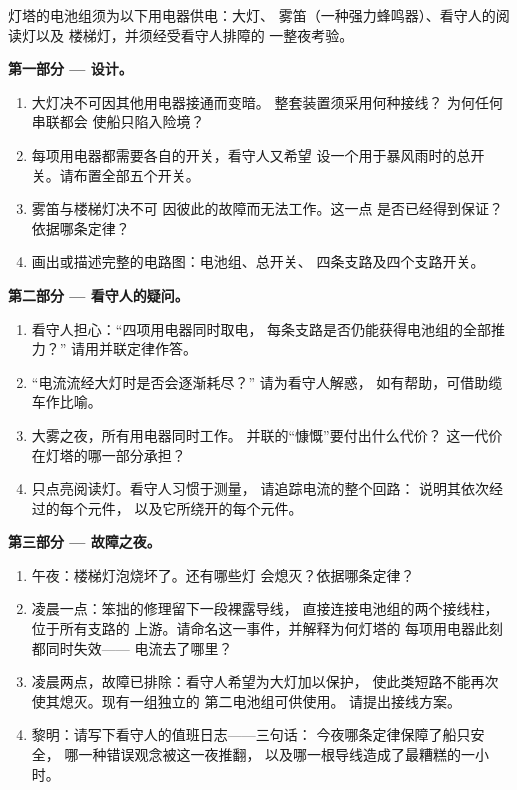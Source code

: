 \begin{problem}\label{pb:g7:circuits-series-parallel:1}
灯塔的电池组须为以下用电器供电：大灯、
雾笛（一种强力蜂鸣器）、看守人的阅读灯以及
楼梯灯，并须经受看守人排障的
一整夜考验。

\medskip\noindent\textbf{第一部分 --- 设计。}
\begin{enumerate}
  \item 大灯决不可因其他用电器接通而变暗。
        整套装置须采用何种接线？
        为何任何串联都会
        使船只陷入险境？
  \item 每项用电器都需要各自的开关，看守人又希望
        设一个用于暴风雨时的总开关。请布置全部五个开关。
  \item 雾笛与楼梯灯决不可
        因彼此的故障而无法工作。这一点
        是否已经得到保证？依据哪条定律？
  \item 画出或描述完整的电路图：电池组、总开关、
        四条支路及四个支路开关。
\end{enumerate}

\medskip\noindent\textbf{第二部分 --- 看守人的疑问。}
\begin{enumerate}[resume]
  \item 看守人担心：“四项用电器同时取电，
        每条支路是否仍能获得电池组的全部推力？”
        请用并联定律作答。
  \item “电流流经大灯时是否会逐渐耗尽？”
        请为看守人解惑，
        如有帮助，可借助缆车作比喻。
  \item 大雾之夜，所有用电器同时工作。
        并联的“慷慨”要付出什么代价？
        这一代价在灯塔的哪一部分承担？
  \item 只点亮阅读灯。看守人习惯于测量，
        请追踪电流的整个回路：
        说明其依次经过的每个元件，
        以及它所绕开的每个元件。
\end{enumerate}

\medskip\noindent\textbf{第三部分 --- 故障之夜。}
\begin{enumerate}[resume]
  \item 午夜：楼梯灯泡烧坏了。还有哪些灯
        会熄灭？依据哪条定律？
  \item 凌晨一点：笨拙的修理留下一段裸露导线，
        直接连接电池组的两个接线柱，位于所有支路的
        上游。请命名这一事件，并解释为何灯塔的
        每项用电器此刻都同时失效——
        电流去了哪里？
  \item 凌晨两点，故障已排除：看守人希望为大灯加以保护，
        使此类短路不能再次使其熄灭。现有一组独立的
        第二电池组可供使用。
        请提出接线方案。
  \item 黎明：请写下看守人的值班日志——三句话：
        今夜哪条定律保障了船只安全，
        哪一种错误观念被这一夜推翻，
        以及哪一根导线造成了最糟糕的一小时。
\end{enumerate}
\end{problem}
